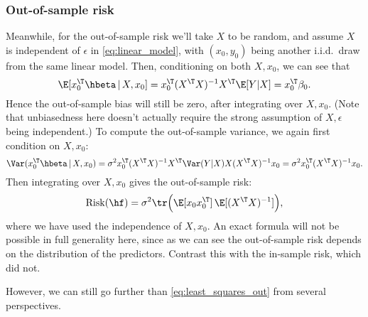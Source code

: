 \documentclass{article}
\begin{document}
\subsubsection{Out-of-sample risk}

Meanwhile, for the out-of-sample risk we'll take $X$ to be random, and assume
$X$ is independent of $\epsilon$ in \eqref{eq:linear_model}, with $(x_0,y_0)$
being another i.i.d.\ draw from the same linear model. Then, conditioning on
both $X,x_0$, we can see that 
\[
\E [x_0^\T \hbeta \,|\, X,x_0] = x_0^\T (X^\T X)^{-1} X^\T \E[Y|X] = x_0^\T \beta_0.   
\]
Hence the out-of-sample bias will still be zero, after integrating over
$X,x_0$. (Note that unbiasedness here doesn't actually require the strong
assumption of $X,\epsilon$ being independent.) To compute the out-of-sample 
variance, we again first condition on $X,x_0$:
\[
\Var(x_0^\T \hbeta \,|\, X, x_0) = \sigma^2 x_0^\T (X^\T X)^{-1} X^\T \Var(Y|X)
X (X^\T X)^{-1} x_0 = \sigma^2 x_0^\T (X^\T X)^{-1} x_0.
\]
Then integrating over $X,x_0$ gives the out-of-sample risk:
\begin{equation}
\label{eq:least_squares_out}
\Risk(\hf) = \sigma^2 \tr\Big(\E [x_0 x_0^\T] \, \E [(X^\T X)^{-1}] \Big), 
\end{equation}
where we have used the independence of $X,x_0$. An exact formula will not be
possible in full generality here, since as we can see the out-of-sample risk
depends on the distribution of the predictors. Contrast this with the in-sample
risk, which did not.

However, we can still go further than \eqref{eq:least_squares_out} from several
perspectives.   
\end{document}
